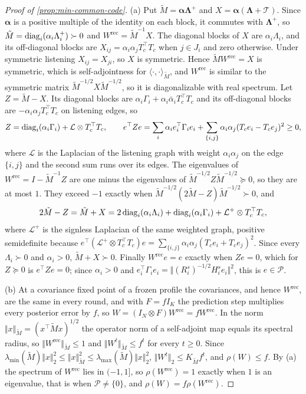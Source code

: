 \begin{proof}[Proof of \cref{prop:min-common-code}]
(a) Put $\tilde M=\boldsymbol\alpha\boldsymbol\Lambda^+$ and $X=\boldsymbol\alpha(\boldsymbol\Lambda+\mathcal T)$. Since $\boldsymbol\alpha$ is a positive multiple of the identity on each block, it commutes with $\boldsymbol\Lambda^+$, so $\tilde M=\operatorname{diag}_i(\alpha_i\Lambda^+_i)\succ0$ and $W^{\mathrm{rec}}=\tilde M^{-1}X$. The diagonal blocks of $X$ are $\alpha_i\Lambda_i$, and its off-diagonal blocks are $X_{ij}=\alpha_i\alpha_jT_c^\top T_c$ when $j\in J_i$ and zero otherwise. Under symmetric listening $X_{ij}=X_{ji}$, so $X$ is symmetric. Hence $\tilde MW^{\mathrm{rec}}=X$ is symmetric, which is self-adjointness for $\langle\cdot,\cdot\rangle_{\tilde M}$, and $W^{\mathrm{rec}}$ is similar to the symmetric matrix $\tilde M^{-1/2}X\tilde M^{-1/2}$, so it is diagonalizable with real spectrum. Let $Z=\tilde M-X$. Its diagonal blocks are $\alpha_i\Gamma_i+\alpha_i\bar\alpha_iT_c^\top T_c$ and its off-diagonal blocks are $-\alpha_i\alpha_jT_c^\top T_c$ on listening edges, so
\[
Z=\operatorname{diag}_i(\alpha_i\Gamma_i)+\mathcal L\otimes T_c^\top T_c,\qquad e^\top Ze=\sum_i\alpha_ie_i^\top\Gamma_ie_i+\sum_{\{i,j\}}\alpha_i\alpha_j(T_ce_i-T_ce_j)^2\ge0,
\]
where $\mathcal L$ is the Laplacian of the listening graph with weight $\alpha_i\alpha_j$ on the edge $\{i,j\}$ and the second sum runs over its edges. The eigenvalues of $W^{\mathrm{rec}}=I-\tilde M^{-1}Z$ are one minus the eigenvalues of $\tilde M^{-1/2}Z\tilde M^{-1/2}\succeq0$, so they are at most $1$. They exceed $-1$ exactly when $\tilde M^{-1/2}(2\tilde M-Z)\tilde M^{-1/2}\succ0$, and
\[
2\tilde M-Z=\tilde M+X=2\operatorname{diag}_i(\alpha_i\Lambda_i)+\operatorname{diag}_i(\alpha_i\Gamma_i)+\mathcal L^{+}\otimes T_c^\top T_c,
\]
where $\mathcal L^{+}$ is the signless Laplacian of the same weighted graph, positive semidefinite because $e^\top(\mathcal L^+\otimes T_c^\top T_c)e=\sum_{\{i,j\}}\alpha_i\alpha_j(T_ce_i+T_ce_j)^2$. Since every $\Lambda_i\succ0$ and $\alpha_i>0$, $\tilde M+X\succ0$. Finally $W^{\mathrm{rec}}e=e$ exactly when $Ze=0$, which for $Z\succeq0$ is $e^\top Ze=0$; since $\alpha_i>0$ and $e_i^\top\Gamma_ie_i=\Vert(R^s_i)^{-1/2}H^s_ie_i\Vert^2$, this is $e\in\mathcal P$.

(b) At a covariance fixed point of a frozen profile the covariances, and hence $W^{\mathrm{rec}}$, are the same in every round, and with $F=fI_K$ the prediction step multiplies every posterior error by $f$, so $W=(I_N\otimes F)W^{\mathrm{rec}}=fW^{\mathrm{rec}}$. In the norm $\Vert x\Vert_{\tilde M}=(x^\top\tilde Mx)^{1/2}$ the operator norm of a self-adjoint map equals its spectral radius, so $\Vert W^{\mathrm{rec}}\Vert_{\tilde M}\le1$ and $\Vert W^t\Vert_{\tilde M}\le f^t$ for every $t\ge0$. Since $\lambda_{\min}(\tilde M)\Vert x\Vert_2^2\le\Vert x\Vert_{\tilde M}^2\le\lambda_{\max}(\tilde M)\Vert x\Vert_2^2$, $\Vert W^t\Vert_2\le K_{\tilde M}f^t$, and $\rho(W)\le f$. By (a) the spectrum of $W^{\mathrm{rec}}$ lies in $(-1,1]$, so $\rho(W^{\mathrm{rec}})=1$ exactly when $1$ is an eigenvalue, that is when $\mathcal P\neq\{0\}$, and $\rho(W)=f\rho(W^{\mathrm{rec}})$.


\end{proof}
